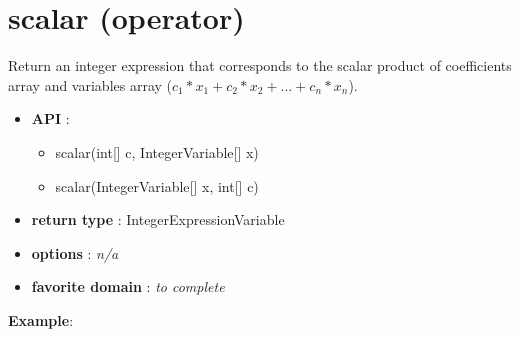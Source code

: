 \label{scalar}
\hypertarget{scalar}{}

\section{scalar (operator)}\label{scalar:scalaroperator}\hypertarget{scalar:scalaroperator}{}
Return an integer expression that corresponds to the scalar product of coefficients array and variables array (\(c_1*x_1+c_2*x_2+...+c_n*x_n\)).

\begin{itemize}
	\item \textbf{API} :
	\begin{itemize}
		\item scalar(int[] c, IntegerVariable[] x)
		\item scalar(IntegerVariable[] x, int[] c)
	\end{itemize}
	\item \textbf{return type} : IntegerExpressionVariable
	\item \textbf{options} : \emph{n/a}
	\item \textbf{favorite domain} : \emph{to complete}
\end{itemize}

\textbf{Example}:



